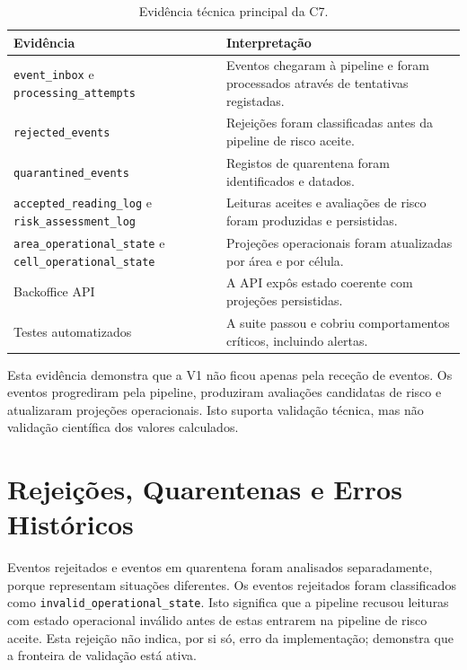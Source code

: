 \begin{table}[h]
\centering
\caption{Evidência técnica principal da C7.}
\label{tab:c7-main-evidence}
\begin{tabular}{p{} p{}}
\hline
\textbf{Evidência} & \textbf{Interpretação} \\
\hline
\texttt{event\_inbox} e \texttt{processing\_attempts} & Eventos chegaram à pipeline e foram processados através de tentativas registadas. \\
\texttt{rejected\_events} & Rejeições foram classificadas antes da pipeline de risco aceite. \\
\texttt{quarantined\_events} & Registos de quarentena foram identificados e datados. \\
\texttt{accepted\_reading\_log} e \texttt{risk\_assessment\_log} & Leituras aceites e avaliações de risco foram produzidas e persistidas. \\
\texttt{area\_operational\_state} e \texttt{cell\_operational\_state} & Projeções operacionais foram atualizadas por área e por célula. \\
Backoffice API & A API expôs estado coerente com projeções persistidas. \\
Testes automatizados & A suite passou e cobriu comportamentos críticos, incluindo alertas. \\
\hline
\end{tabular}
\end{table}

Esta evidência demonstra que a V1 não ficou apenas pela receção de eventos. Os eventos progrediram pela pipeline, produziram avaliações candidatas de risco e atualizaram projeções operacionais. Isto suporta validação técnica, mas não validação científica dos valores calculados.

\section{Rejeições, Quarentenas e Erros Históricos}

Eventos rejeitados e eventos em quarentena foram analisados separadamente, porque representam situações diferentes. Os eventos rejeitados foram classificados como \texttt{invalid\_operational\_state}. Isto significa que a pipeline recusou leituras com estado operacional inválido antes de estas entrarem na pipeline de risco aceite. Esta rejeição não indica, por si só, erro da implementação; demonstra que a fronteira de validação está ativa.

